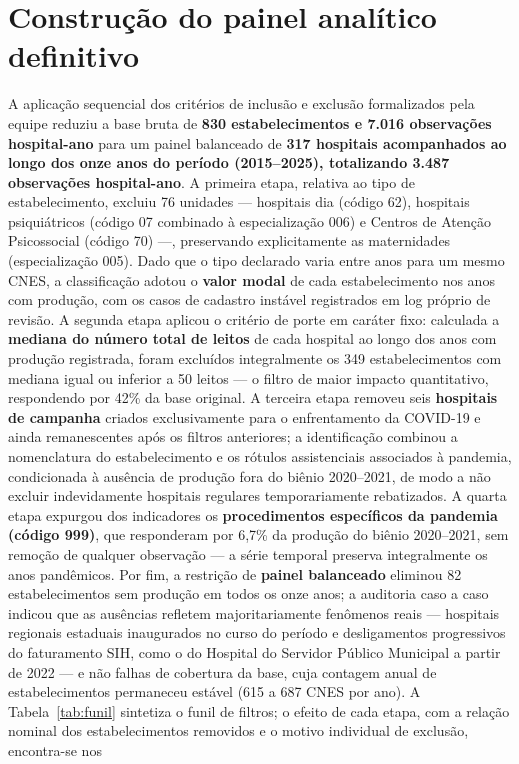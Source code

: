 
\section*{Construção do painel analítico definitivo}

A aplicação sequencial dos critérios de inclusão e exclusão formalizados pela equipe reduziu a base bruta de \textbf{830 estabelecimentos e 7.016 observações hospital-ano} para um painel balanceado de \textbf{317 hospitais acompanhados ao longo dos onze anos do período (2015--2025), totalizando 3.487 observações hospital-ano}. A primeira etapa, relativa ao tipo de estabelecimento, excluiu 76 unidades --- hospitais dia (código 62), hospitais psiquiátricos (código 07 combinado à especialização 006) e Centros de Atenção Psicossocial (código 70) ---, preservando explicitamente as maternidades (especialização 005). Dado que o tipo declarado varia entre anos para um mesmo CNES, a classificação adotou o \textbf{valor modal} de cada estabelecimento nos anos com produção, com os casos de cadastro instável registrados em log próprio de revisão. A segunda etapa aplicou o critério de porte em caráter fixo: calculada a \textbf{mediana do número total de leitos} de cada hospital ao longo dos anos com produção registrada, foram excluídos integralmente os 349 estabelecimentos com mediana igual ou inferior a 50 leitos --- o filtro de maior impacto quantitativo, respondendo por 42\% da base original. A terceira etapa removeu seis \textbf{hospitais de campanha} criados exclusivamente para o enfrentamento da COVID-19 e ainda remanescentes após os filtros anteriores; a identificação combinou a nomenclatura do estabelecimento e os rótulos assistenciais associados à pandemia, condicionada à ausência de produção fora do biênio 2020--2021, de modo a não excluir indevidamente hospitais regulares temporariamente rebatizados. A quarta etapa expurgou dos indicadores os \textbf{procedimentos específicos da pandemia (código 999)}, que responderam por 6,7\% da produção do biênio 2020--2021, sem remoção de qualquer observação --- a série temporal preserva integralmente os anos pandêmicos. Por fim, a restrição de \textbf{painel balanceado} eliminou 82 estabelecimentos sem produção em todos os onze anos; a auditoria caso a caso indicou que as ausências refletem majoritariamente fenômenos reais --- hospitais regionais estaduais inaugurados no curso do período e desligamentos progressivos do faturamento SIH, como o do Hospital do Servidor Público Municipal a partir de 2022 --- e não falhas de cobertura da base, cuja contagem anual de estabelecimentos permaneceu estável (615 a 687 CNES por ano). A Tabela~\ref{tab:funil} sintetiza o funil de filtros; o efeito de cada etapa, com a relação nominal dos estabelecimentos removidos e o motivo individual de exclusão, encontra-se nos 